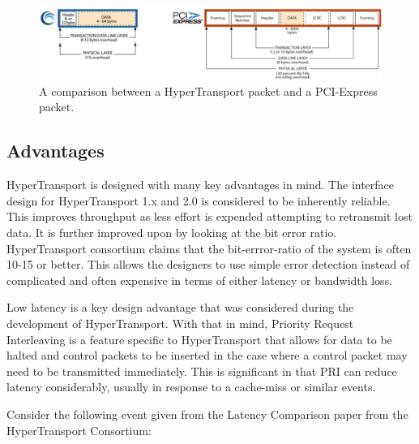 \documentclass[conference]{IEEEtran}
\begin{document}
\begin{figure}[!t]
	\begin{center}
		\includegraphics[scale=.2]{htPacket}
	\end{center}
	\caption{A comparison between a HyperTransport packet and a PCI-Express
	packet.\cite{holden2006latency}}
\end{figure}
 
\subsection{Advantages}
\label{subsec:ht:advant}
HyperTransport is designed with many key advantages in mind. The interface
design for HyperTransport 1.x and 2.0 is considered to be inherently reliable.
This improves throughput as less effort is expended attempting to retransmit
lost data. It is further improved upon by looking at the bit error ratio.
HyperTransport consortium claims that the bit-errror-ratio of the system is
often 10-15 or better.\cite{holden2006latency} This allows the designers to use
simple error detection instead of complicated and often expensive in terms of either latency or
bandwidth loss. 

Low latency is a key design advantage that was considered during the development
of HyperTransport. With that in mind, Priority Request Interleaving is a feature
specific to HyperTransport that allows for data to be halted and control packets
to be inserted in the case where a control packet may need to be transmitted
immediately. This is significant in that PRI can reduce latency considerably,
usually in response to a cache-miss or similar events\cite{holden2006latency}.

Consider the following event given from the Latency Comparison paper from
the HyperTransport Consortium:

\cite{holden2006latency}
\end{document}
